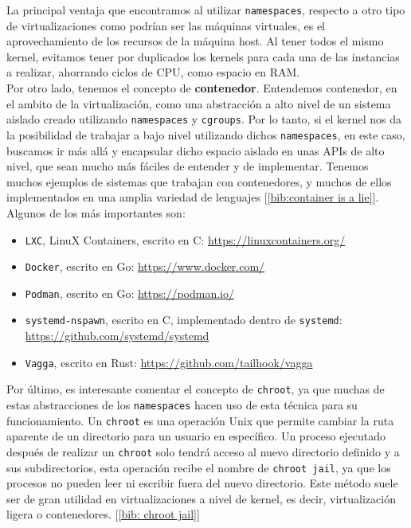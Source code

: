 \documentclass[12pt]{article}
\begin{document}
	\noindent La principal ventaja que encontramos al utilizar \texttt{namespaces}, respecto a otro tipo de virtualizaciones como podrían ser las máquinas virtuales, es el aprovechamiento de los recursos de la máquina host. Al tener todos el mismo kernel, evitamos tener por duplicados los kernels para cada una de las instancias a realizar, ahorrando ciclos de CPU, como espacio en RAM.\\
	
	\noindent Por otro lado, tenemos el concepto de \textbf{contenedor}. Entendemos contenedor, en el ambito de la virtualización, como una abstracción a alto nivel de un sistema aislado creado utilizando \texttt{namespaces} y \texttt{cgroups}. Por lo tanto, si el kernel nos da la posibilidad de trabajar a bajo nivel utilizando dichos \texttt{namespaces}, en este caso, buscamos ir más allá y encapsular dicho espacio aislado en unas APIs de alto nivel, que sean mucho más fáciles de entender y de implementar. Tenemos muchos ejemplos de sistemas que trabajan con contenedores, y muchos de ellos implementados en una amplia variedad de lenguajes [\ref{bib:container is a lie}]. Algunos de los más importantes son:
	\begin{itemize}
		\item \texttt{LXC}, LinuX Containers, escrito en C: \url{https://linuxcontainers.org/}
		\item \texttt{Docker}, escrito en Go: \url{https://www.docker.com/}
		\item \texttt{Podman}, escrito en Go: \url{https://podman.io/}
		\item \texttt{systemd-nspawn}, escrito en C, implementado dentro de \texttt{systemd}: \url{https://github.com/systemd/systemd}
		\item \texttt{Vagga}, escrito en Rust: \url{https://github.com/tailhook/vagga}
	\end{itemize}

	\noindent Por último, es interesante comentar el concepto de \texttt{chroot}, ya que muchas de estas abstracciones de los \texttt{namespaces} hacen uso de esta técnica para su funcionamiento. Un \texttt{chroot} es una operación Unix que permite cambiar la ruta aparente de un directorio para un usuario en específico. Un proceso ejecutado después de realizar un \texttt{chroot} solo tendrá acceso al nuevo directorio definido y a sus subdirectorios, esta operación recibe el nombre de \texttt{chroot jail}, ya que los procesos no pueden leer ni escribir fuera del nuevo directorio. Este método suele ser de gran utilidad en virtualizaciones a nivel de kernel, es decir, virtualización ligera o contenedores. [\ref{bib: chroot jail}]
	
\end{document}
